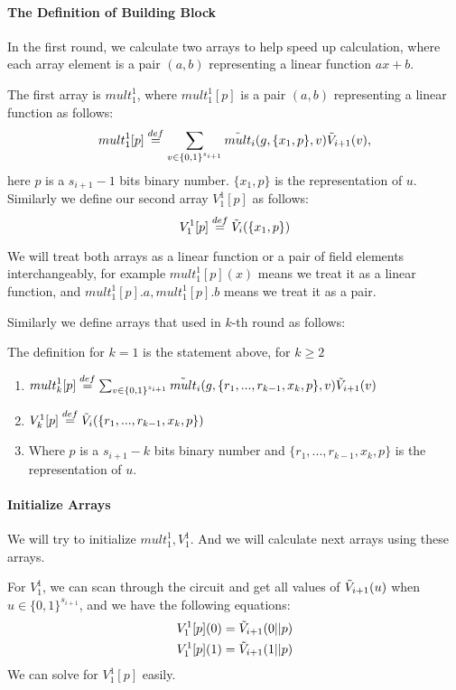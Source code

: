 {{{	\paragraph{The Definition of Building Block}
	In the first round, we calculate two arrays to help speed up calculation, where each array element is a pair $(a, b)$ representing a linear function $ax+b$.
	
	The first array is $mult_1^1$, where $mult_1^1[p]$ is a pair $(a, b)$ representing a linear function as follows:
	$${mult}_1^1[p]\overset{def}{=}\sum_{v\in \{0,1\}^{s_{i+1}}}\tilde{mult}_i(g, \{x_1, p\}, v)\tilde{V}_{i+1}(v),$$
	here $p$ is a $s_{i+1}-1$ bits binary number. $\{x_1, p\}$ is the representation of $u$. Similarly we define our second array ${V}_1^1[p]$ as follows:
	$$V_1^1[p]\overset{def}{=}\tilde{V}_i(\{x_1, p\})$$
	
	We will treat both arrays as a linear function or a pair of field elements interchangeably, for example ${mult}_1^1[p](x)$ means we treat it as a linear function, and ${mult}_1^1[p].a, {mult}_1^1[p].b$ means we treat it as a pair.
	
	Similarly we define arrays that used in $k$-th round as follows:
	\begin{definition}
		
		The definition for $k=1$ is the statement above, for $k\ge 2$
		\begin{enumerate}
			\item ${mult}_k^1[p]\overset{def}{=}\sum_{v\in \{0, 1\}^{s_{i+1}}}\tilde{mult}_i(g, \{r_1, ..., r_{k-1}, x_k, p\}, v)\tilde{V}_{i+1}(v)$
			\item ${V}_k^1[p]\overset{def}{=}\tilde{V}_i(\{r_1, ..., r_{k-1}, x_k, p\})$
			\item Where $p$ is a $s_{i+1}-k$ bits binary number and $\{r_1, ..., r_{k-1}, x_k, p\}$ is the representation of $u$.
		\end{enumerate}
	\end{definition}
	
	\paragraph{Initialize Arrays}
	We will try to initialize ${mult}_1^1, {V}_1^1$. And we will calculate next arrays using these arrays.
	
	For ${V}_1^1$, we can scan through the circuit and get all values of $\tilde{V}_{i+1}(u)$ when $u \in \{0, 1\}^{s_{i+1}}$, and we have the following equations:
	\begin{align*}
	{V}_1^1[p](0)=\tilde{V}_{i+1}(0||p)\\
	{V}_1^1[p](1)=\tilde{V}_{i+1}(1||p)
	\end{align*}
	We can solve for ${V}_1^1[p]$ easily.
	
}}}
